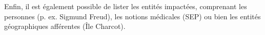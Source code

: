 
Enfin, il est également possible de lister les entités impactées, comprenant les personnes (p. ex. Sigmund Freud), les notions médicales (SEP) ou bien les entités géographiques afférentes (Île Charcot).


%
